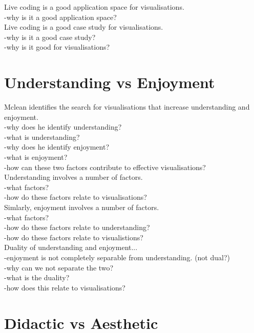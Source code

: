 Live coding is a good application space for visualisations.\\
-why is it a good application space?\\

Live coding is a good case study for visualisations.\\
-why is it a good case study?\\
-why is it good for visualisations?\\




\section{Understanding vs Enjoyment}

Mclean identifies the search for visualisations that increase understanding and enjoyment.\\
-why does he identify understanding?\\
-what is understanding?\\
-why does he identify enjoyment?\\
-what is enjoyment?\\
-how can these two factors contribute to effective visualisations?\\

Understanding involves a number of factors.\\
-what factors?\\
-how do these factors relate to visualisations?\\

Simlarly, enjoyment involves a number of factors.\\
-what factors?\\
-how do these factors relate to understanding?\\
-how do these factors relate to visualistions?\\

Duality of understanding and enjoyment...\\
-enjoyment is not completely separable from understanding. (not dual?)\\
-why can we not separate the two?\\
-what is the duality?\\
-how does this relate to visualisations?\\


\section{Didactic vs Aesthetic}

